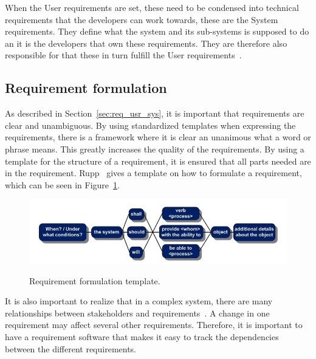 When the User requirements are set, these need to be condensed into technical
requirements that the developers can work towards, these are the System
requirements. They define what the system and its sub-systems is supposed to do
an it is the developers that own these requirements. They are therefore also
responsible for that these in turn fulfill the User requirements~\cite{ibm_req}.

\subsection{Requirement formulation}
As described in Section~\ref{sec:req_usr_sys}, it is important that requirements
are clear and unambiguous. By using standardized templates when expressing the
requirements, there is a framework where it is clear an unanimous what a word or
phrase means.  This greatly increases the quality of the
requirements\cite{rupp2014}.  By using a template for the structure of a
requirement, it is ensured that all parts needed are in the requirement.
Rupp~\cite{rupp2014} gives a template on how to formulate a
requirement, which can be seen in Figure~\ref{fig:req_template}.
\begin{figure}[H]
    \centering\label{fig:req_template}
    \includegraphics[width=\textwidth]{./img/introduction_req_template.PNG}
    \caption{Requirement formulation template.}
\end{figure}
It is also important to realize that in a complex system, there are many
relationships between stakeholders and requirements~\cite{ibm_req}. A change in
one requirement may affect several other requirements. Therefore, it is
important to have a requirement software that makes it easy to track the
dependencies between the different requirements.

